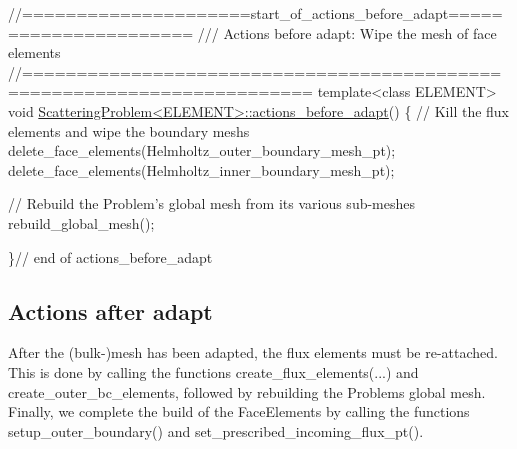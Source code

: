  
\begin{DoxyCodeInclude}
\textcolor{comment}{//=====================start\_of\_actions\_before\_adapt======================}
\textcolor{comment}{/// Actions before adapt: Wipe the mesh of face elements}
\textcolor{comment}{}\textcolor{comment}{//========================================================================}
\textcolor{keyword}{template}<\textcolor{keyword}{class} ELEMENT>
\textcolor{keywordtype}{void} \hyperlink{classScatteringProblem_aca1b756a307f9c1d8a70c7b7e68a296b}{ScatteringProblem<ELEMENT>::actions\_before\_adapt}()
\{ 
 \textcolor{comment}{// Kill the flux elements and wipe the boundary meshs}
 delete\_face\_elements(Helmholtz\_outer\_boundary\_mesh\_pt);
 delete\_face\_elements(Helmholtz\_inner\_boundary\_mesh\_pt);

 \textcolor{comment}{// Rebuild the Problem's global mesh from its various sub-meshes}
 rebuild\_global\_mesh();

\}\textcolor{comment}{// end of actions\_before\_adapt}

\end{DoxyCodeInclude}




 

\hypertarget{index_after_adapt}{}\subsection{Actions after adapt}\label{index_after_adapt}
After the (bulk-\/)mesh has been adapted, the flux elements must be re-\/attached. This is done by calling the functions {\ttfamily create\+\_\+flux\+\_\+elements}(...) and {\ttfamily create\+\_\+outer\+\_\+bc\+\_\+elements}, followed by rebuilding the Problem\textquotesingle{}s global mesh. Finally, we complete the build of the {\ttfamily Face\+Elements} by calling the functions {\ttfamily setup\+\_\+outer\+\_\+boundary()} and {\ttfamily set\+\_\+prescribed\+\_\+incoming\+\_\+flux\+\_\+pt()}.

